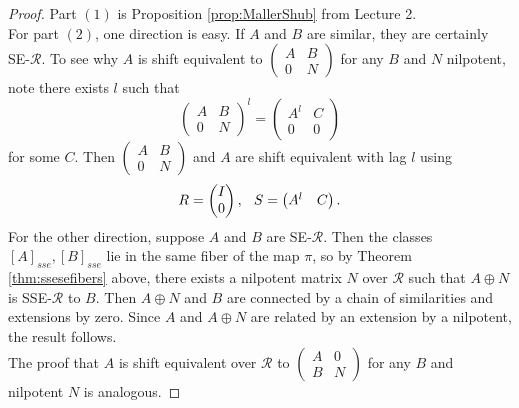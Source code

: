 \documentclass{amsart}
\newcommand{\si}{\index}
\theoremstyle{definition}
\theoremstyle{definition}
\newcommand{\calR}{\mathcal{R}}
\numberwithin{equation}{subsection}
\begin{document}
\begin{proof}
Part $(1)$ is Proposition \ref{prop:MallerShub} from Lecture 2.\\
\indent For part $(2)$, one direction is easy. If $A$ and $B$ are similar, they are certainly SE-$\calR$. To see why $A$ is shift equivalent to $\left(\begin{smallmatrix} A & B \\ 0 & N \end{smallmatrix}\right)$ for any $B$ and $N$ nilpotent, note there exists $l$ such that
$$\begin{pmatrix} A & B \\ 0 & N \end{pmatrix}^{l} = \begin{pmatrix} A^{l} & C \\ 0 & 0 \end{pmatrix}$$
for some $C$. Then $\left(\begin{smallmatrix} A & B \\ 0 & N \end{smallmatrix}\right)$ and $A$ are shift equivalent with lag\si{lag} $l$ using
$$R = \begin{pmatrix} I \\ 0 \end{pmatrix}, \hspace{.1in} S = \begin{pmatrix} A^{l} & C \end{pmatrix}.$$
For the other direction, suppose $A$ and $B$ are SE-$\calR$. Then the classes $[A]_{sse}, [B]_{sse}$ lie in the same fiber of the map $\pi$, so by Theorem \ref{thm:ssesefibers} above, there exists a nilpotent matrix $N$ over $\calR$ such that $A \oplus N$ is SSE-$\calR$ to $B$. Then $A \oplus N$ and $B$ are connected by a chain of similarities and extensions by zero. Since $A$ and $A \oplus N$ are related by an extension by a nilpotent, the result follows.\\
\indent The proof that $A$ is shift equivalent over $\calR$ to $\left(\begin{smallmatrix} A & 0 \\ B & N \end{smallmatrix}\right)$ for any $B$ and nilpotent $N$ is analogous.
\end{proof}
\end{document}
